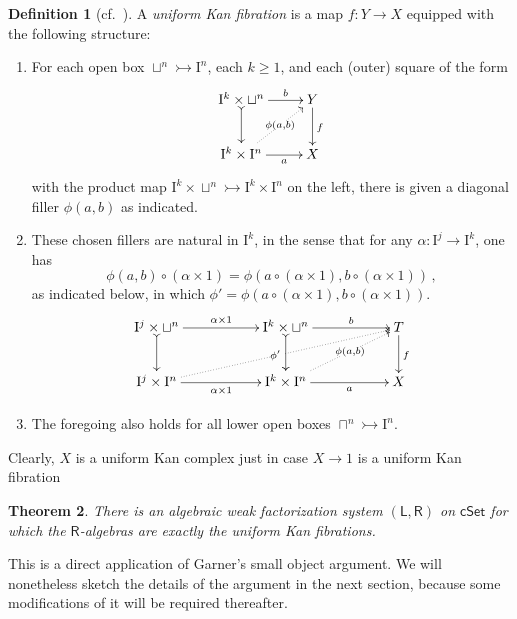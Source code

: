 \documentclass[12pt]{article}
\newcommand{\cSet}{\ensuremath{\mathsf{cSet}}}
\newcommand{\LL}{\ensuremath{\mathsf{L}}}
\newcommand{\RR}{\ensuremath{\mathsf{R}}}
\newcommand{\mono}{\ensuremath{\rightarrowtail}}
\newcommand{\I}{\ensuremath{\mathrm{I}}}
\newtheorem{theorem}{Theorem}
\theoremstyle{remark}
\theoremstyle{definition}
\newtheorem{definition}[theorem]{Definition}
\begin{document}
\begin{definition}[cf.~\cite{BCH}]
A \emph{uniform Kan fibration} is a map $f : Y\to X$ equipped with the following structure: 
\begin{enumerate}

\item  For each open box $\sqcup^n \mono \I^n$, each $k\geq 1$, and each (outer) square of the form
\begin{equation}%
\xymatrix{
\I^k \times \sqcup^n \ar@{>->}[d] \ar[r]^-{b} & Y \ar[d]^{f} \\
\I^k \times \I^n \ar[r]_-{a} \ar@{.>}[ru]|-{\phi(a,b)} & X
}
\end{equation}
with the product map $\I^k\times\sqcup^n \mono \I^k\times\I^n$ on the left, there is given a diagonal filler $\phi(a,b)$ as indicated.

\item These chosen fillers are natural in $\I^k$, in the sense that for any $\alpha : \I^j \to \I^k$, one has
\[
\phi(a,b)\circ(\alpha\times 1) = \phi(a\circ (\alpha\times 1), b\circ (\alpha\times 1))\,,
\]
as indicated below, in which $\phi' = \phi(a\circ(\alpha\times 1), b\circ(\alpha\times 1))$.
\begin{equation}\label{diagram:coherencefillers}
\xymatrix{
\I^j \times \sqcup^n \ar@{>->}[d] \ar[rr]^{\alpha\times 1} && \I^k \times \sqcup^n  \ar@{>->}[d] \ar[rr]^-{b} && \ar[d]^{f} T \\
\I^j \times \I^n \ar[rr]_{\alpha\times 1} \ar@{..>}[rrrru]|{\phi'\ } && \I^k \times \I^n \ar[rr]_-{a} \ar@{.>}[rru]|-{\phi(a,b)}  && X
}
\end{equation}

\item The foregoing also holds for all lower open boxes $\sqcap^n \mono \I^n$.

\end{enumerate}
\end{definition}

Clearly, $X$ is a uniform Kan complex just in case $X\to 1$ is a uniform Kan fibration

\begin{theorem}\label{thm:AWFS1}
There is an algebraic weak factorization system $(\LL,\RR)$ on $\cSet$ for which the $\RR$-algebras are exactly the uniform Kan fibrations.
\end{theorem}

This is a direct application of Garner's small object argument. We will nonetheless sketch the details of the argument in the next section, because some modifications of it will be required thereafter. 
\end{document}
